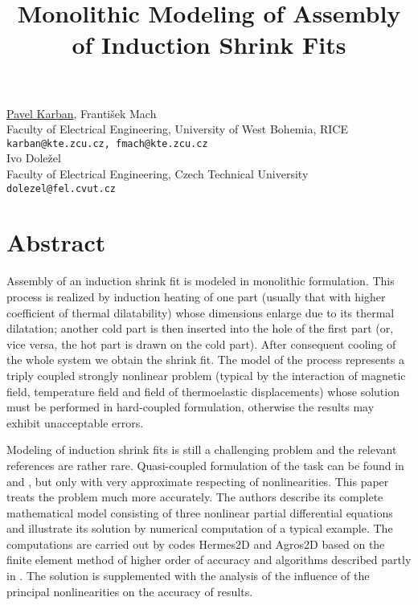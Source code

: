 \title{Monolithic Modeling of Assembly of Induction Shrink Fits}
\author{} \institute{}
\maketitle

\begin{center}
{\large \underline{Pavel Karban}, Franti\v{s}ek Mach}\\
Faculty of Electrical Engineering, University of West Bohemia, RICE\\
{\tt karban@kte.zcu.cz, fmach@kte.zcu.cz}\\
\vspace{4mm}
{\large Ivo Dole\v{z}el}\\
Faculty of Electrical Engineering, Czech Technical University\\
{\tt dolezel@fel.cvut.cz}
\end{center}

\section*{Abstract}
Assembly of an induction shrink fit is modeled in monolithic formulation. This process is realized by induction heating of one part (usually that with higher coefficient of thermal dilatability) whose dimensions enlarge due to its thermal dilatation; another cold part is then inserted into the hole of the first part (or, vice versa, the hot part is drawn on the cold part). After consequent cooling of the whole system we obtain the shrink fit. The model of the process represents a triply coupled strongly nonlinear problem (typical by the interaction of magnetic field, temperature field and field of thermoelastic displacements) whose solution must be performed in hard-coupled formulation, otherwise the results may exhibit unacceptable errors.

Modeling of induction shrink fits is still a challenging problem and the relevant references are rather rare. Quasi-coupled formulation of the task can be found in \cite{karban1} and \cite{karban2}, but only with very approximate respecting of nonlinearities. This paper treats the problem much more accurately. The authors describe its complete mathematical model consisting of three nonlinear partial differential equations and illustrate its solution by numerical computation of a typical example. The computations are carried out by codes Hermes2D and Agros2D \cite{karban3} based on the finite element method of higher order of accuracy and algorithms described partly in \cite{karban4}. The solution is supplemented with the analysis of the influence of the principal nonlinearities on the accuracy of results.

